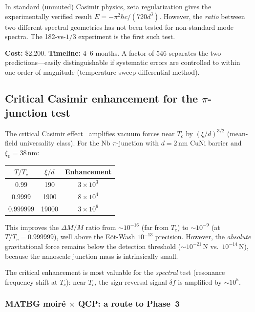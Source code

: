 \documentclass[aps,prd,twocolumn,superscriptaddress,nofootinbib]{revtex4-2}
\begin{document}
In standard (unmuted) Casimir physics, zeta regularization
gives the experimentally verified result $E = -\pi^2\hbar c/(720 d^3)$.
However, the \emph{ratio} between two different spectral geometries
has not been tested for non-standard mode spectra.
The 182-vs-$1/3$ experiment is the first such test.

\textbf{Cost:} \$2{,}200.
\textbf{Timeline:} 4--6 months.
A factor of 546 separates the two predictions---easily
distinguishable if systematic errors are controlled to within
one order of magnitude (temperature-sweep differential method).

\subsection{Critical Casimir enhancement for the $\pi$-junction test}

The critical Casimir effect~\cite{FisherDeGennes1978,Hertlein2008}
amplifies vacuum forces near $T_c$ by $(\xi/d)^{3/2}$
(mean-field universality class).
For the Nb $\pi$-junction with $d = 2$\,nm CuNi barrier
and $\xi_0 = 38$\,nm:

\begin{center}
\begin{tabular}{ccc}
\toprule
$T/T_c$ & $\xi/d$ & Enhancement \\
\midrule
$0.99$ & 190 & $3 \times 10^3$ \\
$0.9999$ & 1900 & $8 \times 10^4$ \\
$0.999999$ & 19000 & $3 \times 10^6$ \\
\bottomrule
\end{tabular}
\end{center}

This improves the $\Delta M / M$ ratio from $\sim 10^{-16}$
(far from $T_c$) to $\sim 10^{-9}$ (at $T/T_c = 0.999999$),
well above the E\"ot-Wash $10^{-13}$ precision.
However, the \emph{absolute} gravitational force remains
below the detection threshold ($\sim 10^{-21}$\,N vs.\
$10^{-14}$\,N), because the nanoscale junction mass is
intrinsically small.

The critical enhancement is most valuable for the
\emph{spectral} test (resonance frequency shift at $T_c$):
near $T_c$, the sign-reversal signal $\delta f$ is amplified
by $\sim 10^5$.

\subsubsection{MATBG moir\'e $\times$ QCP: a route to Phase~3}
\end{document}
